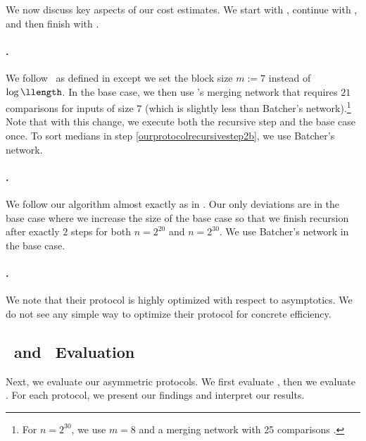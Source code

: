 \noindent We now discuss key aspects of our cost estimates. %
We start with \ourprotocol, continue with \ourprotocoltwo, and then finish with \cite{EPRINT:BBDLO22}.

\paragraph{\ourprotocol.}

We follow \ourprotocol\ as defined in  except we set the block size $m:=7$ instead of $\log\llength$. In the base case, we then use \cite{TCS:MI04}'s merging network that requires $21$ comparisons for inputs of size $7$ (which is slightly less than Batcher's network).\footnote{For $n=2^{30}$, we use $m = 8$ and a merging network with 25 comparisons \cite{TCS:MI04}.} Note that with this change, we execute both the recursive step and the base case once.
To sort medians in step \ref{ourprotocolrecursivestep2b}, we use Batcher's network.

\paragraph{\ourprotocoltwo.} 

We follow our algorithm almost exactly as in . Our only deviations are in the base case where we increase the size of the base case so that we finish recursion after exactly $2$ steps for both $n=2^{20}$ and $n=2^{30}$. We use Batcher's network \cite{AFIPS:Bat68} in the base case.

\paragraph{\cite{EPRINT:BBDLO22}.} We note that their protocol is highly optimized with respect to asymptotics. We do not see any simple way to optimize their protocol for concrete efficiency.



\subsection{\sqrtmergeprotocol\ and \knmergeprotocol\ Evaluation}\label{sec:asymmetriceval}

Next, we evaluate our asymmetric protocols. We first evaluate \sqrtmergeprotocol, then we evaluate \knmergeprotocol.
For each protocol, we present our findings and interpret our results. %

